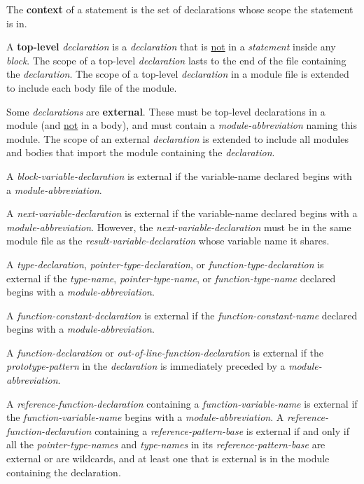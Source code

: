 \documentclass[12pt]{article}
\newcommand{\key}[1]{{\rm \bfseries #1}}
\begin{document}
The \key{context}\label{CONTEXT} of a statement is the set of declarations
whose scope the statement is in.

A \key{top-level} {\em declaration} is a {\em declaration} that is
\underline{not} in a {\em statement} inside any {\em block}.
The scope of a top-level {\em declaration} lasts to the end of the
file containing the {\em declaration}.
The scope of a top-level {\em declaration} in a module file is extended
to include each body file of the module.

Some {\em declarations} are \key{external}\label{EXTERNAL}.
These must be top-level declarations in a module (and \underline{not}
in a body), and must contain a {\em module-abbreviation} naming this
module.
The scope of an external
{\em declaration} is extended to include all modules and bodies that
import the module containing the {\em declaration}.

A {\em block-variable-declaration}
is external if the {variable-name} declared begins with a
{\em module-abbreviation}.

A {\em next-variable-declaration}
is external if the {variable-name} declared begins with a
{\em module-abbreviation}.  However, the {\em next-variable-declaration}
must be in the same module file as the {\em result-variable-declaration}
whose variable name it shares.

A {\em type-declaration}, {\em pointer-type-declaration}, or
{\em function-type-declaration}
\label{EXTERNAL-TYPE-NAME}
is external if the {\em type-name}, {\em pointer-type-name},
or {\em function-type-name}
declared begins with a
{\em module-abbrev\-i\-a\-tion}.

A {\em function-constant-declaration}
is external if the {\em function-constant-name}
declared begins with a
{\em module-abbrev\-i\-a\-tion}.

A {\em function-declaration}
or {\em out-of-line-function-declar\-a\-tion}
is external\label{EXTERNAL-FUNCTION}
if the {\em prototype-pattern} in the {\em declaration}
is immediately preceded by a {\em module-abbreviation}.

A {\em reference-function-declaration} containing a
{\em function-variable-name}
is external if the {\em func\-tion-variable-name} begins with a
{\em module-abbreviation}.
A {\em reference-function-declaration} containing a
{\em reference-pattern-base} is external if and only if
all the {\em pointer-type-names}
and {\em type-names} in its {\em reference-pattern-base} are external or
are wildcards, and at least one that is external is in the
module containing the declaration.
\end{document}
